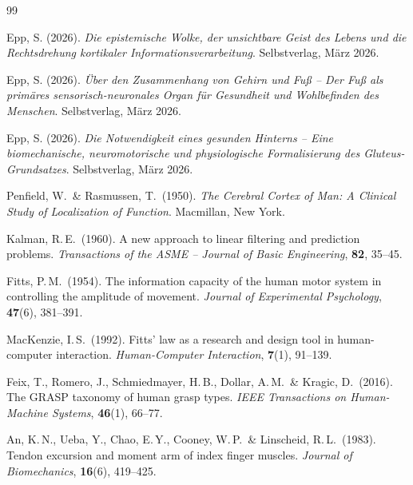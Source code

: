 ﻿\documentclass[12pt,a4paper]{report}
\theoremstyle{plain}
\theoremstyle{definition}
\theoremstyle{remark}
\begin{document}
\begin{thebibliography}{99}

Epp, S. (2026). \emph{Die epistemische Wolke, der unsichtbare Geist des
Lebens und die Rechtsdrehung kortikaler Informationsverarbeitung}.
Selbstverlag, März 2026.

Epp, S. (2026). \emph{Über den Zusammenhang von Gehirn und Fuß --
Der Fuß als primäres sensorisch-neuronales Organ für Gesundheit und
Wohlbefinden des Menschen}. Selbstverlag, März 2026.

Epp, S. (2026). \emph{Die Notwendigkeit eines gesunden Hinterns --
Eine biomechanische, neuromotorische und physiologische Formalisierung
des Gluteus-Grundsatzes}. Selbstverlag, März 2026.

Penfield, W.\ \& Rasmussen, T.\ (1950). \emph{The Cerebral Cortex
of Man: A Clinical Study of Localization of Function}. Macmillan, New York.

Kalman, R.\,E.\ (1960). A new approach to linear filtering and prediction
problems. \emph{Transactions of the ASME -- Journal of Basic Engineering},
\textbf{82}, 35--45.

Fitts, P.\,M.\ (1954). The information capacity of the human motor system
in controlling the amplitude of movement. \emph{Journal of Experimental
Psychology}, \textbf{47}(6), 381--391.

MacKenzie, I.\,S.\ (1992). Fitts' law as a research and design tool in
human-computer interaction. \emph{Human-Computer Interaction}, \textbf{7}(1),
91--139.

Feix, T., Romero, J., Schmiedmayer, H.\,B., Dollar, A.\,M.\ \&
Kragic, D.\ (2016). The GRASP taxonomy of human grasp types.
\emph{IEEE Transactions on Human-Machine Systems}, \textbf{46}(1), 66--77.

An, K.\,N., Ueba, Y., Chao, E.\,Y., Cooney, W.\,P.\ \& Linscheid, R.\,L.\
(1983). Tendon excursion and moment arm of index finger muscles.
\emph{Journal of Biomechanics}, \textbf{16}(6), 419--425.


\end{thebibliography}
\end{document}
